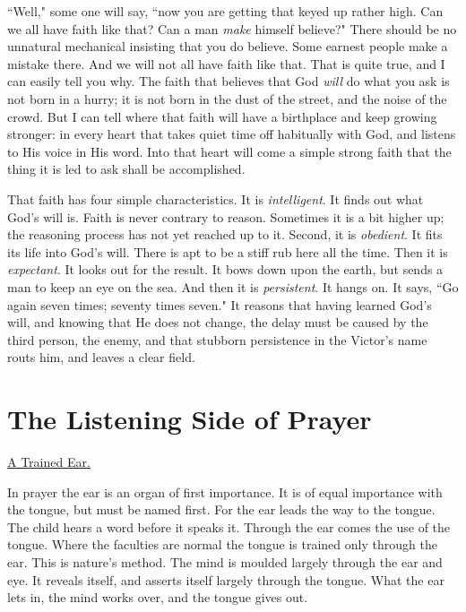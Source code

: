 ``Well," some one will say, ``now you are getting that keyed up rather high.
Can we all have faith like that? Can a man \textit{make} himself believe?" There
should be no unnatural mechanical insisting that you do believe. Some
earnest people make a mistake there. And we will not all have faith like
that. That is quite true, and I can easily tell you why. The faith that
believes that God \textit{will} do what you ask is not born in a hurry; it is not
born in the dust of the street, and the noise of the crowd. But I can tell
where that faith will have a birthplace and keep growing stronger: in
every heart that takes quiet time off habitually with God, and listens to
His voice in His word. Into that heart will come a simple strong faith
that the thing it is led to ask shall be accomplished.

That faith has four simple characteristics. It is \textit{intelligent}. It finds
out what God's will is. Faith is never contrary to reason. Sometimes it is
a bit higher up; the reasoning process has not yet reached up to it.
Second, it is \textit{obedient}. It fits its life into God's will. There is apt
to be a stiff rub here all the time. Then it is \textit{expectant}. It looks out
for the result. It bows down upon the earth, but sends a man to keep an
eye on the sea. And then it is \textit{persistent}. It hangs on. It says, ``Go
again seven times; seventy times seven." It reasons that having learned
God's will, and knowing that He does not change, the delay must be caused
by the third person, the enemy, and that stubborn persistence in the
Victor's name routs him, and leaves a clear field.




\chapter{The Listening Side of Prayer}



\underline{A Trained Ear.}


In prayer the ear is an organ of first importance. It is of equal
importance with the tongue, but must be named first. For the ear leads the
way to the tongue. The child hears a word before it speaks it. Through the
ear comes the use of the tongue. Where the faculties are normal the tongue
is trained only through the ear. This is nature's method. The mind is
moulded largely through the ear and eye. It reveals itself, and asserts
itself largely through the tongue. What the ear lets in, the mind works
over, and the tongue gives out.

